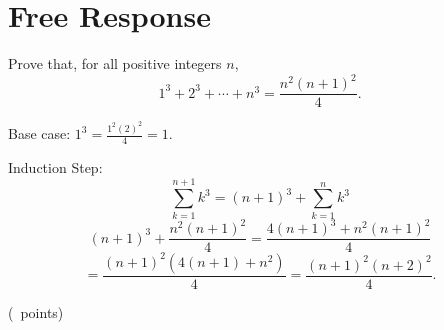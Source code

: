\section{Free Response}

\begin{questions}

    \question[5] Prove that, for all positive integers $n$,
        $$1^3 + 2^3 + \cdots + n^3 = \frac{n^2(n+1)^2}{4}.$$
    \begin{solution}
        Base case: $1^3 = \frac{1^2(2)^2}{4} = 1$.

        Induction Step: 
        $$\sum_{k=1}^{n+1} k^3 = (n+1)^3 + \sum_{k=1}^n k^3$$
        $$  (n+1)^3 + \frac{n^2(n+1)^2}{4}
          = \frac{ 4(n+1)^3 + n^2(n+1)^2 }{4}$$
        $$ = \frac{ (n+1)^2 ( 4(n+1) + n^2 ) }{4}
           = \frac{ (n+1)^2 (n+2)^2 }{4}.$$        
    \end{solution}


    \question

    \question (\totalpoints\ points)
    \begin{parts}

\end{parts}
\end{questions}
